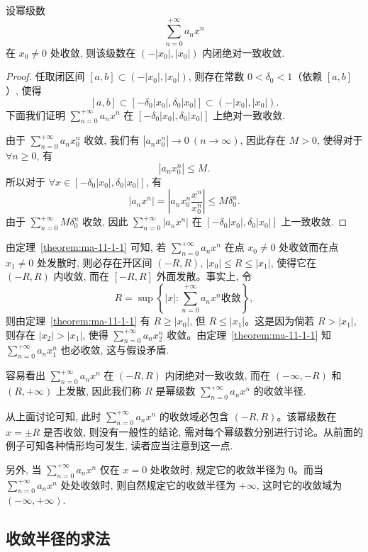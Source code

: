 \begin{theorem}\label{theorem:ma-11-1-1}
设幂级数
\[
  \sum_{n=0}^{+\infty}a_nx^n
\]
在 $x_0\ne0$ 处收敛, 则该级数在 $(-|x_0|,|x_0|)$ 内闭绝对一致收敛.
\end{theorem}


\begin{proof}
任取闭区间 $[a,b]\subset(-|x_0|,|x_0|)$, 则存在常数 $0<\delta_0<1$（依赖 $[a,b]$）, 使得
\[
  [a,b]\subset[-\delta_0|x_0|,\delta_0|x_0|]\subset(-|x_0|,|x_0|).
\]
下面我们证明 $\sum_{n=0}^{+\infty}a_nx^n$ 在 $[-\delta_0|x_0|,\delta_0|x_0|]$ 上绝对一致收敛.

由于 $\sum_{n=0}^{+\infty}a_nx_0^n$ 收敛, 我们有 $|a_nx_0^n|\to0\ (n\to\infty)$, 因此存在 $M>0$, 使得对于 $\forall n\geqslant0$, 有
\[
  |a_nx_0^n|\leqslant M.
\]
所以对于 $\forall x\in[-\delta_0|x_0|,\delta_0|x_0|]$, 有
\[
  |a_nx^n|
  =
  \left|a_nx_0^n\frac{x^n}{x_0^n}\right|
  \leqslant M\delta_0^n.
\]
由于 $\sum_{n=0}^{+\infty}M\delta_0^n$ 收敛, 因此 $\sum_{n=0}^{+\infty}|a_nx^n|$ 在 $[-\delta_0|x_0|,\delta_0|x_0|]$ 上一致收敛.
\end{proof}


由定理~\ref{theorem:ma-11-1-1} 可知, 若 $\sum_{n=0}^{+\infty}a_nx^n$ 在点 $x_0\ne0$ 处收敛而在点 $x_1\ne0$ 处发散时, 则必存在开区间 $(-R,R)$, $|x_0|\leqslant R\leqslant |x_1|$, 使得它在 $(-R,R)$ 内收敛, 而在 $[-R,R]$ 外面发散。事实上, 令
\[
  R=\sup\left\{|x|:\sum_{n=0}^{+\infty}a_nx^n\text{收敛}\right\},
\]
则由定理~\ref{theorem:ma-11-1-1} 有 $R\geqslant |x_0|$, 但 $R\leqslant |x_1|$。这是因为倘若 $R>|x_1|$, 则存在 $|x_2|>|x_1|$, 使得 $\sum_{n=0}^{+\infty}a_nx_2^n$ 收敛。由定理~\ref{theorem:ma-11-1-1} 知 $\sum_{n=0}^{+\infty}a_nx_1^n$ 也必收敛, 这与假设矛盾.

容易看出 $\sum_{n=0}^{+\infty}a_nx^n$ 在 $(-R,R)$ 内闭绝对一致收敛, 而在 $(-\infty,-R)$ 和 $(R,+\infty)$ 上发散, 因此我们称 $R$ 是幂级数 $\sum_{n=0}^{+\infty}a_nx^n$ 的收敛半径.

从上面讨论可知, 此时 $\sum_{n=0}^{+\infty}a_nx^n$ 的收敛域必包含 $(-R,R)$。该幂级数在 $x=\pm R$ 是否收敛, 则没有一般性的结论, 需对每个幂级数分别进行讨论。从前面的例子可知各种情形均可发生, 读者应当注意到这一点.

另外, 当 $\sum_{n=0}^{+\infty}a_nx^n$ 仅在 $x=0$ 处收敛时, 规定它的收敛半径为 $0$。而当 $\sum_{n=0}^{+\infty}a_nx^n$ 处处收敛时, 则自然规定它的收敛半径为 $+\infty$, 这时它的收敛域为 $(-\infty,+\infty)$.

\subsection{收敛半径的求法}
\label{subsec:ma-11-1-2}

